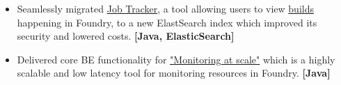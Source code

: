 \begin{itemize}
{        by decreasing P99 of BE endpoint powering it from ~30s to less than 1s.
    }
    \item {
        Seamlessly migrated
        \href{https://www.palantir.com/docs/foundry/data-integration/application-reference/#builds}{Job Tracker},
        a tool allowing users to view
        \href{https://www.palantir.com/docs/foundry/data-integration/builds/}{builds}
        happening in Foundry, to a new ElastSearch index which improved its security and lowered costs.
    }
    \textbf{[Java, ElasticSearch]}
    \item {
        Delivered core BE functionality for
        \href{https://www.palantir.com/docs/foundry/maintaining-pipelines/monitoring-views-intro/}{"Monitoring at scale"}
        which is a highly scalable and low latency tool for monitoring resources in Foundry.
    }
    \textbf{[Java]}
\end{itemize}
